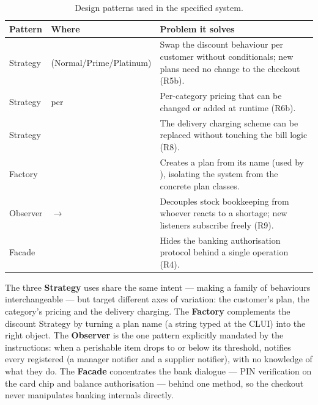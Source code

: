 \begin{table}[H]
\centering
\small
\begin{tabularx}{\linewidth}{p{1.9cm} >{\raggedright\arraybackslash}p{3.7cm} Y}
\toprule
\textbf{Pattern} & \textbf{Where} & \textbf{Problem it solves} \\
\midrule
Strategy &  (Normal/Prime/Platinum) & Swap the discount
behaviour per customer without conditionals; new plans need no change to the
checkout (R5b). \\
Strategy &  per  & Per-category pricing that
can be changed or added at runtime (R6b). \\
Strategy & \allowbreak{} & The delivery charging scheme can be
replaced without touching the bill logic (R8). \\
Factory & \allowbreak{} & Creates a plan from its name (used by
), isolating the system from the concrete plan classes. \\
Observer &  $\rightarrow$  & Decouples stock
bookkeeping from whoever reacts to a shortage; new listeners subscribe freely
(R9). \\
Facade & \allowbreak{}\allowbreak{} & Hides the banking authorisation
protocol behind a single  operation (R4). \\
\bottomrule
\end{tabularx}
\caption{Design patterns used in the specified system.}
\label{tab:patterns}
\end{table}

The three \textbf{Strategy} uses share the same intent --- making a family of
behaviours interchangeable --- but target different axes of variation: the
customer's plan, the category's pricing and the delivery charging. The
\textbf{Factory} complements the discount Strategy by turning a plan name (a
string typed at the CLUI) into the right object. The \textbf{Observer} is the one
pattern explicitly mandated by the instructions: when a perishable item drops to
or below its threshold,  notifies every registered
 (a manager notifier and a supplier notifier), with no
knowledge of what they do. The \textbf{Facade} concentrates the bank dialogue ---
PIN verification on the card chip and balance authorisation --- behind one method,
so the checkout never manipulates banking internals directly.

